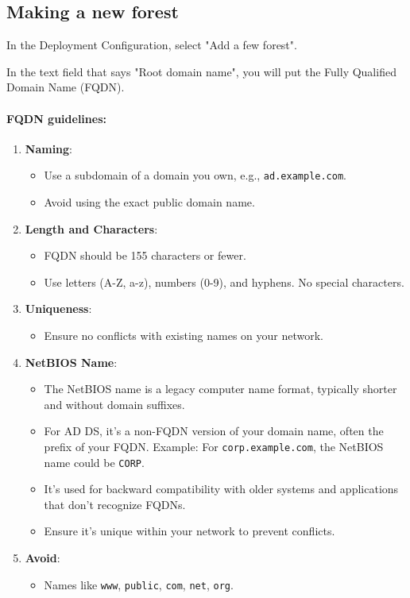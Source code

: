 \documentclass{article}
\begin{document}
\subsection{Making a new forest}
In the Deployment Configuration, select "Add a few forest".

In the text field that says "Root domain name", you will put the Fully
Qualified Domain Name (FQDN).

\paragraph{FQDN guidelines:}

\begin{enumerate}
\item \textbf{Naming}:
\begin{itemize}
        \item Use a subdomain of a domain you own, e.g., \texttt{ad.example.com}.
        \item Avoid using the exact public domain name.
\end{itemize}

\item \textbf{Length and Characters}:
\begin{itemize}
        \item FQDN should be 155 characters or fewer.
        \item Use letters (A-Z, a-z), numbers (0-9), and hyphens. No special characters.
\end{itemize}

\item \textbf{Uniqueness}:
\begin{itemize}
        \item Ensure no conflicts with existing names on your network.
\end{itemize}

\item \textbf{NetBIOS Name}:
\begin{itemize}
    \item The NetBIOS name is a legacy computer name format, typically shorter and without domain suffixes.
    \item For AD DS, it's a non-FQDN version of your domain name, often the prefix of your FQDN. Example: For \texttt{corp.example.com}, the NetBIOS name could be \texttt{CORP}.
    \item It's used for backward compatibility with older systems and applications that don't recognize FQDNs.
    \item Ensure it's unique within your network to prevent conflicts.
\end{itemize}

\item \textbf{Avoid}:
\begin{itemize}
        \item Names like \texttt{www}, \texttt{public}, \texttt{com}, \texttt{net}, \texttt{org}.
\end{itemize}
\end{enumerate}
\end{document}
